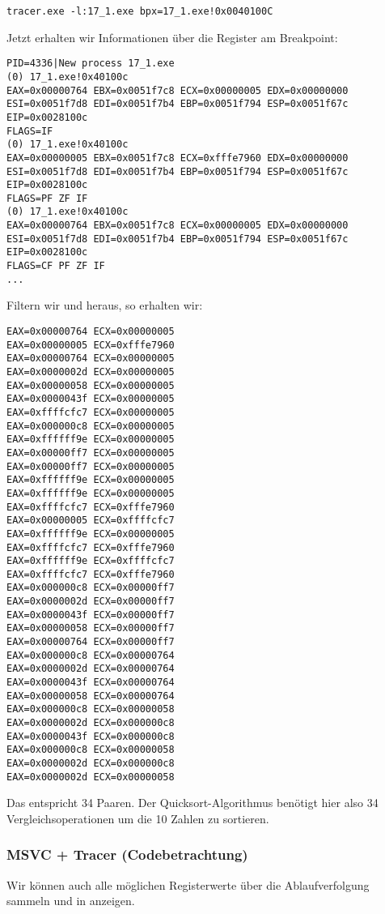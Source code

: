 \begin{lstlisting}
tracer.exe -l:17_1.exe bpx=17_1.exe!0x0040100C
\end{lstlisting}

Jetzt erhalten wir Informationen über die Register am Breakpoint:

\begin{lstlisting}
PID=4336|New process 17_1.exe
(0) 17_1.exe!0x40100c
EAX=0x00000764 EBX=0x0051f7c8 ECX=0x00000005 EDX=0x00000000
ESI=0x0051f7d8 EDI=0x0051f7b4 EBP=0x0051f794 ESP=0x0051f67c
EIP=0x0028100c
FLAGS=IF
(0) 17_1.exe!0x40100c
EAX=0x00000005 EBX=0x0051f7c8 ECX=0xfffe7960 EDX=0x00000000
ESI=0x0051f7d8 EDI=0x0051f7b4 EBP=0x0051f794 ESP=0x0051f67c
EIP=0x0028100c
FLAGS=PF ZF IF
(0) 17_1.exe!0x40100c
EAX=0x00000764 EBX=0x0051f7c8 ECX=0x00000005 EDX=0x00000000
ESI=0x0051f7d8 EDI=0x0051f7b4 EBP=0x0051f794 ESP=0x0051f67c
EIP=0x0028100c
FLAGS=CF PF ZF IF
...
\end{lstlisting}

Filtern wir  und  heraus, so erhalten wir:

\begin{lstlisting}
EAX=0x00000764 ECX=0x00000005
EAX=0x00000005 ECX=0xfffe7960
EAX=0x00000764 ECX=0x00000005
EAX=0x0000002d ECX=0x00000005
EAX=0x00000058 ECX=0x00000005
EAX=0x0000043f ECX=0x00000005
EAX=0xffffcfc7 ECX=0x00000005
EAX=0x000000c8 ECX=0x00000005
EAX=0xffffff9e ECX=0x00000005
EAX=0x00000ff7 ECX=0x00000005
EAX=0x00000ff7 ECX=0x00000005
EAX=0xffffff9e ECX=0x00000005
EAX=0xffffff9e ECX=0x00000005
EAX=0xffffcfc7 ECX=0xfffe7960
EAX=0x00000005 ECX=0xffffcfc7
EAX=0xffffff9e ECX=0x00000005
EAX=0xffffcfc7 ECX=0xfffe7960
EAX=0xffffff9e ECX=0xffffcfc7
EAX=0xffffcfc7 ECX=0xfffe7960
EAX=0x000000c8 ECX=0x00000ff7
EAX=0x0000002d ECX=0x00000ff7
EAX=0x0000043f ECX=0x00000ff7
EAX=0x00000058 ECX=0x00000ff7
EAX=0x00000764 ECX=0x00000ff7
EAX=0x000000c8 ECX=0x00000764
EAX=0x0000002d ECX=0x00000764
EAX=0x0000043f ECX=0x00000764
EAX=0x00000058 ECX=0x00000764
EAX=0x000000c8 ECX=0x00000058
EAX=0x0000002d ECX=0x000000c8
EAX=0x0000043f ECX=0x000000c8
EAX=0x000000c8 ECX=0x00000058
EAX=0x0000002d ECX=0x000000c8
EAX=0x0000002d ECX=0x00000058
\end{lstlisting}

Das entspricht 34 Paaren.
Der Quicksort-Algorithmus benötigt hier also 34 Vergleichsoperationen um die 10 Zahlen zu sortieren.

\clearpage
\subsubsection{MSVC + Tracer (Codebetrachtung)}
Wir können auch alle möglichen Registerwerte über die Ablaufverfolgung sammeln und in \IDA anzeigen.

